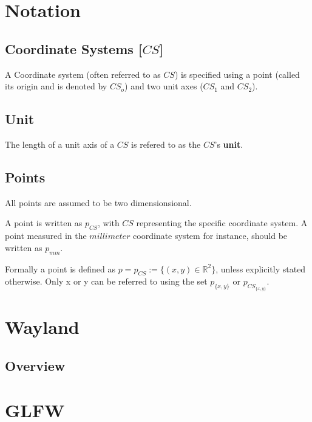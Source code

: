 \documentclass[12pt]{article}
\begin{document}
\tableofcontents

\bigskip
\bigskip
\bigskip

\pagebreak


\section{Notation}

\subsection{Coordinate Systems [$CS$]}

A Coordinate system (often referred to as $CS$) is specified using a point (called its origin and is denoted by $CS_o$) and two unit axes ($CS_1$ and $CS_2$). 


\subsection{Unit}

The length of a unit axis of a $CS$ is refered to as the $CS$'s \textbf{unit}.


\subsection{Points}

All points are assumed to be two dimensionsional.

A point is written as $p_{CS}$, with $CS$ representing the specific coordinate system. A point measured in the $millimeter$ coordinate system for instance, should be written as  $p_{mm}$.

Formally a point is defined as $p = p_{CS} := \{(x, y) \in \mathbb{R}^2\}$, unless explicitly stated otherwise. Only x or y can be referred to using the set $p_{\{x, y\}}$ or $p_{CS_{\{x, y\}}}$.

\section{Wayland}

\subsection{Overview}




\section{GLFW}
\end{document}
